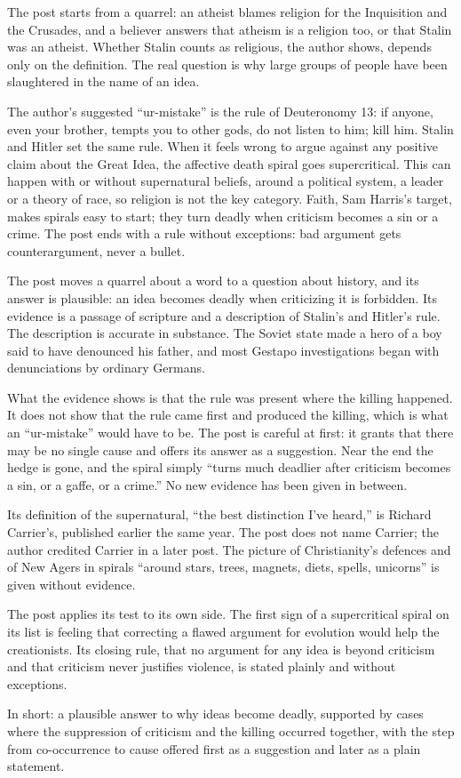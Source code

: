 \begin{afterword}
\summaryhead

The post starts from a quarrel: an atheist blames religion for the Inquisition and the Crusades, and a believer answers that atheism is a religion too, or that Stalin was an atheist. Whether Stalin counts as religious, the author shows, depends only on the definition. The real question is why large groups of people have been slaughtered in the name of an idea.

The author's suggested ``ur-mistake'' is the rule of Deuteronomy 13: if anyone, even your brother, tempts you to other gods, do not listen to him; kill him. Stalin and Hitler set the same rule. When it feels wrong to argue against any positive claim about the Great Idea, the affective death spiral goes supercritical. This can happen with or without supernatural beliefs, around a political system, a leader or a theory of race, so religion is not the key category. Faith, Sam Harris's target, makes spirals easy to start; they turn deadly when criticism becomes a sin or a crime. The post ends with a rule without exceptions: bad argument gets counterargument, never a bullet.

\responsehead

The post moves a quarrel about a word to a question about history, and its answer is plausible: an idea becomes deadly when criticizing it is forbidden. Its evidence is a passage of scripture and a description of Stalin's and Hitler's rule. The description is accurate in substance. The Soviet state made a hero of a boy said to have denounced his father, and most Gestapo investigations began with denunciations by ordinary Germans.

What the evidence shows is that the rule was present where the killing happened. It does not show that the rule came first and produced the killing, which is what an ``ur-mistake'' would have to be. The post is careful at first: it grants that there may be no single cause and offers its answer as a suggestion. Near the end the hedge is gone, and the spiral simply ``turns much deadlier after criticism becomes a sin, or a gaffe, or a crime.'' No new evidence has been given in between.

Its definition of the supernatural, ``the best distinction I've heard,'' is Richard Carrier's, published earlier the same year. The post does not name Carrier; the author credited Carrier in a later post. The picture of Christianity's defences and of New Agers in spirals ``around stars, trees, magnets, diets, spells, unicorns'' is given without evidence.

The post applies its test to its own side. The first sign of a supercritical spiral on its list is feeling that correcting a flawed argument for evolution would help the creationists. Its closing rule, that no argument for any idea is beyond criticism and that criticism never justifies violence, is stated plainly and without exceptions.

In short: a plausible answer to why ideas become deadly, supported by cases where the suppression of criticism and the killing occurred together, with the step from co-occurrence to cause offered first as a suggestion and later as a plain statement.
\end{afterword}
